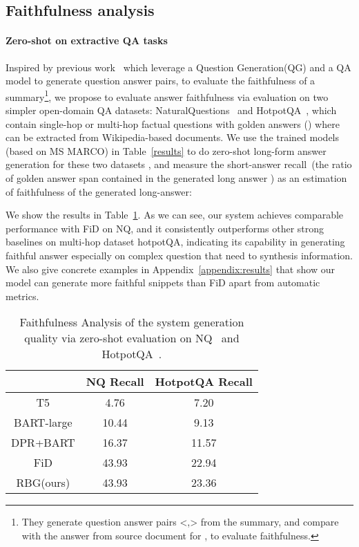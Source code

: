 \documentclass[11pt]{article}
\begin{document}
\vspace{-5pt}
\subsection{Faithfulness analysis}
\vspace{-3pt}

\paragraph{Zero-shot on extractive QA tasks}  Inspired by previous work~\cite{wang2020asking, durmus2020feqa} which leverage a Question Generation(QG) and a QA model to generate question answer pairs, to evaluate the faithfulness of a summary\footnote{
They generate question answer pairs <,> from the summary, and compare  with the answer  from source document for , to evaluate faithfulness.}, we propose to evaluate answer faithfulness via evaluation on two simpler open-domain QA datasets: NaturalQuestions~\cite{kwiatkowski2019natural} and HotpotQA~\cite{yang2018HotpotQA}, which contain single-hop or multi-hop factual questions with golden answers () where  can be extracted from Wikipedia-based documents. We use the trained models (based on MS MARCO) in Table~\ref{results} to do zero-shot long-form answer generation for these two datasets , and measure the short-answer recall~(the ratio of golden answer span  contained in the generated long answer ) as an estimation of faithfulness of the generated long-answer:

We show the results in Table~\ref{nq_HotpotQA}. As we can see, our system achieves comparable performance with FiD on NQ, and it consistently outperforms other strong baselines on multi-hop dataset hotpotQA, indicating its capability in generating faithful answer especially on complex question that need to synthesis information. We also give concrete examples in Appendix~\ref{appendix:results} that show our model can generate more faithful snippets than FiD apart from automatic metrics. 

\begin{table}[!t]
\centering
\resizebox{0.40\textwidth}{!}
{
\begin{tabular}{c|cc}
\hline
          & NQ Recall   & HotpotQA Recall\\ \hline
T5         & 4.76  & 7.20     \\
BART-large & 10.44 & 9.13   \\
DPR+BART   & 16.37 & 11.57     \\
FiD      & 43.93 & 22.94    \\ \hline
RBG(ours)  & 43.93 & 23.36    \\ \hline
\end{tabular}
}
\vspace{-5pt}
\caption{Faithfulness Analysis of the system generation quality via zero-shot evaluation on NQ~\cite{kwiatkowski2019natural} and HotpotQA~\cite{yang2018HotpotQA}.}
\vspace{-10pt}
\label{nq_HotpotQA}
\vspace{-5pt}
\end{table}
\end{document}
